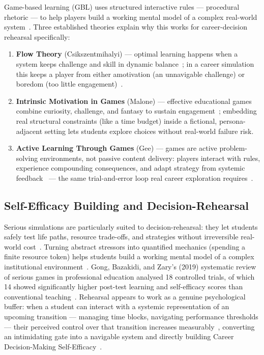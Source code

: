 Game-based learning (GBL) uses structured interactive rules --- procedural rhetoric --- to help players build a working mental model of a complex real-world system~\cite{Bayeck-2020}. Three established theories explain why this works for career-decision rehearsal specifically:

\begin{enumerate}
    \item \textbf{Flow Theory} (Csikszentmihalyi) --- optimal learning happens when a system keeps challenge and skill in dynamic balance~\cite{Csikszentmihalyi-1990}; in a career simulation this keeps a player from either amotivation (an unnavigable challenge) or boredom (too little engagement)~\cite{Maji-2024, Csikszentmihalyi-1990}.
    \item \textbf{Intrinsic Motivation in Games} (Malone) --- effective educational games combine curiosity, challenge, and fantasy to sustain engagement~\cite{Malone-1981}; embedding real structural constraints (like a time budget) inside a fictional, persona-adjacent setting lets students explore choices without real-world failure risk.
    \item \textbf{Active Learning Through Games} (Gee) --- games are active problem-solving environments, not passive content delivery: players interact with rules, experience compounding consequences, and adapt strategy from systemic feedback~\cite{Gee-2007} --- the same trial-and-error loop real career exploration requires~\cite{Savickas-2013, Bayeck-2020}.
\end{enumerate}

\subsection{Self-Efficacy Building and Decision-Rehearsal}

Serious simulations are particularly suited to decision-rehearsal: they let students safely test life paths, resource trade-offs, and strategies without irreversible real-world cost~\cite{Bayeck-2020}. Turning abstract stressors into quantified mechanics (spending a finite resource token) helps students build a working mental model of a complex institutional environment~\cite{Bayeck-2020}. Gong, Bazakidi, and Zary's (2019) systematic review of serious games in professional education analysed 18 controlled trials, of which 14 showed significantly higher post-test learning and self-efficacy scores than conventional teaching~\cite{Gong-2019}. Rehearsal appears to work as a genuine psychological buffer: when a student can interact with a systemic representation of an upcoming transition --- managing time blocks, navigating performance thresholds --- their perceived control over that transition increases measurably~\cite{Gong-2019}, converting an intimidating gate into a navigable system and directly building Career Decision-Making Self-Efficacy~\cite{Hackett-1981, Gong-2019}.


